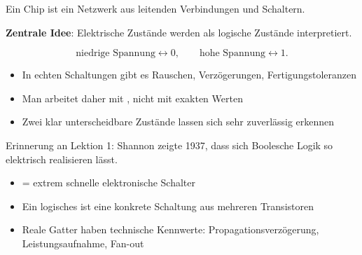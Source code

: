 \renewcommand{\thelektion}{L08 \textperiodcentered{} Logische Gatter I}
\usetikzlibrary{circuits.logic.US}

\begin{frame}\end{frame}

\begin{frame}
\begin{center}
Ein Chip ist ein Netzwerk aus leitenden Verbindungen und Schaltern.
\vspace{4mm}

\textbf{Zentrale Idee}: Elektrische Zustände werden als logische Zustände interpretiert.
\end{center}
\[
    \text{niedrige Spannung} \longleftrightarrow 0,
    \qquad
    \text{hohe Spannung} \longleftrightarrow 1.
\]
\end{frame}

\begin{frame}
\begin{itemize}\setlength\itemsep{7pt}
  \item In echten Schaltungen gibt es Rauschen, Verzögerungen, Fertigungstoleranzen
  \item Man arbeitet daher mit , nicht mit exakten Werten
  \item Zwei klar unterscheidbare Zustände lassen sich sehr zuverlässig erkennen
\end{itemize}
\vspace{3mm}
\begin{center}
Erinnerung an Lektion 1: Shannon zeigte 1937, dass sich Boolesche Logik so elektrisch realisieren lässt.
\end{center}
\end{frame}

\begin{frame}
\begin{itemize}\setlength\itemsep{7pt}
  \item {} = extrem schnelle elektronische Schalter
  \item Ein logisches  ist eine konkrete Schaltung aus mehreren Transistoren
  \item Reale Gatter haben technische Kennwerte: Propagationsverzögerung, Leistungsaufnahme, Fan-out
\end{itemize}
\end{frame}

